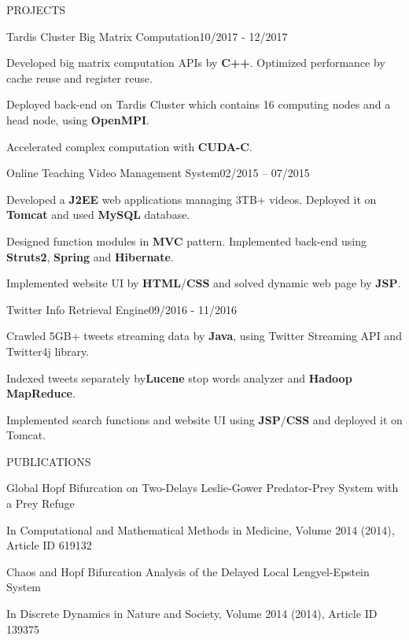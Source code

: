 \documentclass{resume} %
\begin{document}
\begin{rSection}{PROJECTS}
\begin{rSubsection}{Tardis Cluster Big Matrix Computation}{10/2017 - 12/2017}{}{}
\item Developed big matrix computation APIs by {\bf C++}. Optimized performance by cache reuse and register reuse.
\item Deployed back-end on Tardis Cluster which contains 16 computing nodes and a head node, using {\bf OpenMPI}.
\item Accelerated complex computation with {\bf  CUDA-C}.
\end{rSubsection}
\begin{rSubsection}{Online Teaching Video Management System}{02/2015 – 07/2015}{}{}
\item Developed a {\bf J2EE} web applications managing 3TB+ videos. Deployed it on {\bf Tomcat} and used {\bf MySQL} database.
\item Designed function modules in {\bf MVC} pattern. Implemented back-end using {\bf Struts2}, {\bf Spring} and {\bf Hibernate}.
\item Implemented website UI by {\bf HTML}/{\bf CSS} and solved dynamic web page by {\bf JSP}.
\end{rSubsection}
\begin{rSubsection}{Twitter Info Retrieval Engine}{09/2016 - 11/2016}{}{} 
\item Crawled 5GB+ tweets streaming data by {\bf Java}, using Twitter Streaming API and Twitter4j library. 
\item Indexed tweets separately by{\bf  Lucene} stop words analyzer and {\bf Hadoop} {\bf MapReduce}.
\item Implemented search functions and website UI using {\bf JSP}/{\bf CSS} and deployed it on Tomcat.
\end{rSubsection} 
\end{rSection} 
\begin{rSection}{PUBLICATIONS} 
\begin{rSubsection}{Global Hopf Bifurcation on Two-Delays Leslie-Gower Predator-Prey System with a Prey Refuge}{} {} {} 
\item In Computational and Mathematical Methods in Medicine, Volume 2014 (2014), Article ID 619132 
\end{rSubsection}
\begin{rSubsection}{Chaos and Hopf Bifurcation Analysis of the Delayed Local Lengyel-Epstein System}{} {} {} 
\item In
Discrete Dynamics in Nature and Society, Volume 2014 (2014), Article ID 139375
\end{rSubsection}
\end{rSection}
\end{document}
